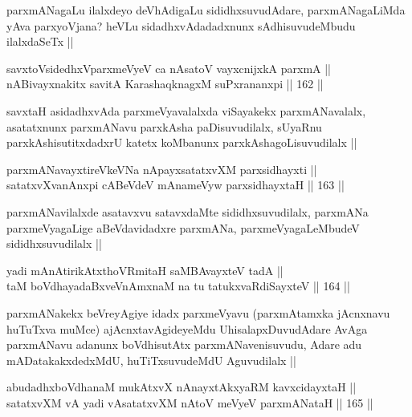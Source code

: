 \begin{artha}
parxmANagaLu ilalxdeyo deVhAdigaLu sididhxsuvudAdare, parxmANagaLiMda yAva parxyoVjana? heVLu sidadhxvAdadadxnunx sAdhisuvudeMbudu ilalxdaSeTx ||
\end{artha}

\begin{shl}
savxtoV\s sidedhxV\s parxmeVyeV ca nAsatoV vayxcnijxkA parxmA || \\
nABivayxnakitx savitA KarashaqknagxM suPxrananxpi ||  162 ||  
\end{shl}

\begin{artha}
savxtaH asidadhxvAda parxmeVyavalalxda viSayakekx parxmANavalalx, asatatxnunx parxmANavu parxkAsha paDisuvudilalx, sUyaRnu parxkAshisutitxdadxrU katetx koMbanunx parxkAshagoLisuvudilalx ||
\end{artha}

\begin{shl}
parxmANavayxtireVkeVNa nApayxsatatxvXM parxsidhayxti || \\
satatxvXvanAnxpi cABeVdeV mAnameVyw parxsidhayxtaH ||  163 ||  
\end{shl}

\begin{artha}
parxmANavilalxde asatavxvu satavxdaMte sididhxsuvudilalx, parxmANa parxmeVyagaLige aBeVdavidadxre parxmANa, parxmeVyagaLeMbudeV sididhxsuvudilalx ||
\end{artha}


\begin{shl}
yadi mAnAtirikAtxthoVR\s mitaH saMBAvayxteV tadA || \\
taM boVdhayadaBxveVnAmxnaM na tu tatukxvaRdiSayxteV ||  164 ||  
\end{shl}

\begin{artha}
parxmANakekx beVreyAgiye idadx parxmeVyavu (parxmAtamxka jAcnxnavu huTuTxva muMce) ajAcnxtavAgideyeMdu UhisalapxDuvudAdare AvAga parxmANavu adanunx boVdhisutAtx parxmANavenisuvudu, Adare adu mADatakakxdedxMdU, huTiTxsuvudeMdU Aguvudilalx ||
\end{artha}

\begin{shl}
abudadhxboVdhanaM mukAtxvX nAnayxtAkxyaRM kavxcidayxtaH || \\
satatxvXM vA yadi vA\s satatxvXM nAtoV meVyeV parxmANataH ||  165 ||  
\end{shl}

